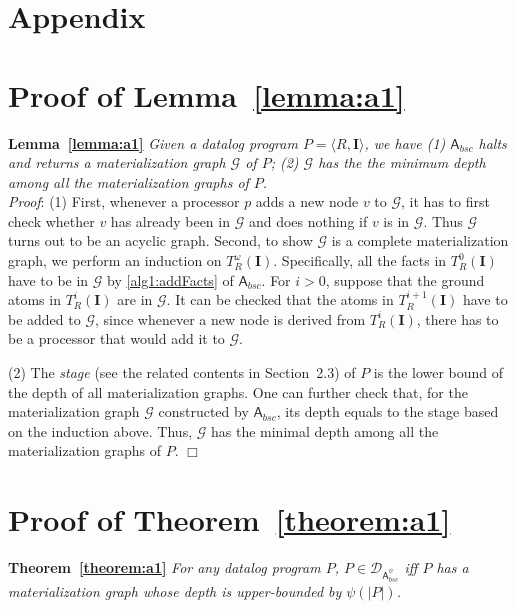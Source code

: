 \documentclass[final,1p,times]{elsarticle}
\begin{document}
\section*{Appendix}

\appendix

\section{Proof of Lemma~\ref{lemma:a1}}

\textbf{Lemma~\ref{lemma:a1}}
\emph{Given a datalog program $P=\langle R, \textbf{I}\rangle$, we have
(1) $\mathsf{A}_{bsc}$ halts and returns a materialization graph $\mathcal{G}$ of $P$;
(2) $\mathcal{G}$ has the the minimum depth among all the materialization graphs of $P$.}\\

\noindent\emph{Proof}:
(1) First, whenever a processor $p$ adds a new node $v$ to $\mathcal{G}$, it has to first
check whether $v$ has already been in $\mathcal{G}$ and does nothing if $v$ is in $\mathcal{G}$.
Thus $\mathcal{G}$ turns out to be an acyclic graph.
Second, to show $\mathcal{G}$ is a
complete materialization graph, we perform an induction on $T_R^{\omega}(\textbf{I})$.
Specifically, all the facts in $T_R^{0}(\textbf{I})$ have to be in $\mathcal{G}$ by \ref{alg1:addFacts}
of $\mathsf{A}_{bsc}$.
For $i>0$, suppose that the ground atoms in $T_R^{i}(\textbf{I})$ are in $\mathcal{G}$.
It can be checked that the atoms in $T_R^{i+1}(\textbf{I})$ have to be
added to $\mathcal{G}$, since whenever a new node is derived from $T_R^{i}(\textbf{I})$,
there has to be a processor that would add it to $\mathcal{G}$.

(2) The \emph{stage} (see the related contents in Section~2.3) of $P$ is the lower bound of the depth
of all materialization graphs. One can further check that, for the materialization graph $\mathcal{G}$
constructed by $\mathsf{A}_{bsc}$, its depth equals to the stage based on the induction above.
Thus, $\mathcal{G}$ has the minimal depth among all the materialization graphs of $P$. \hfill$\Box$

\section{Proof of Theorem~\ref{theorem:a1}}

\textbf{Theorem~\ref{theorem:a1}}
\emph{For any datalog program $P$, $P\in\mathcal{D}_{\mathsf{A}_{bsc}^{\psi}}$ iff
$P$ has a materialization graph whose depth is upper-bounded by $\psi(|P|)$.}\\
\end{document}
